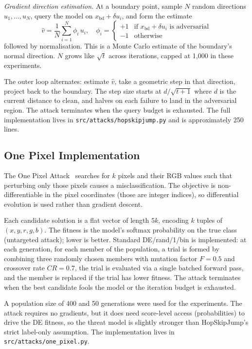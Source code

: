 \textit{Gradient direction estimation.} At a boundary point, sample $N$ random directions $u_1, \dots, u_N$, query the model on $x_{\text{bd}} + \delta u_i$, and form the estimate
\begin{equation}
    \hat{v} = \frac{1}{N} \sum_{i=1}^{N} \phi_i \, u_i, \quad \phi_i = \begin{cases} +1 & \text{if } x_{\text{bd}} + \delta u_i \text{ is adversarial} \\ -1 & \text{otherwise} \end{cases}
\end{equation}
followed by normalisation. This is a Monte Carlo estimate of the boundary's normal direction. $N$ grows like $\sqrt{t}$ across iterations, capped at 1{,}000 in these experiments.

The outer loop alternates: estimate $\hat{v}$, take a geometric step in that direction, project back to the boundary. The step size starts at $d / \sqrt{t+1}$ where $d$ is the current distance to clean, and halves on each failure to land in the adversarial region. The attack terminates when the query budget is exhausted. The full implementation lives in \texttt{src/attacks/hopskipjump.py} and is approximately 250 lines.

\subsection{One Pixel Implementation}

The One Pixel Attack~\cite{su2019onepixel} searches for $k$ pixels and their RGB values such that perturbing only those pixels causes a misclassification. The objective is non-differentiable in the pixel coordinates (those are integer indices), so differential evolution is used rather than gradient descent.

Each candidate solution is a flat vector of length $5k$, encoding $k$ tuples of $(x, y, r, g, b)$. The fitness is the model's softmax probability on the true class (untargeted attack); lower is better. Standard DE/rand/1/bin is implemented: at each generation, for each member of the population, a trial is formed by combining three randomly chosen members with mutation factor $F = 0.5$ and crossover rate $CR = 0.7$, the trial is evaluated via a single batched forward pass, and the member is replaced if the trial has lower fitness. The attack terminates when the best candidate fools the model or the iteration budget is exhausted.

A population size of 400 and 50 generations were used for the experiments. The attack requires no gradients, but it does need score-level access (probabilities) to drive the DE fitness, so the threat model is slightly stronger than HopSkipJump's strict label-only assumption. The implementation lives in \texttt{src/attacks/one\_pixel.py}.

